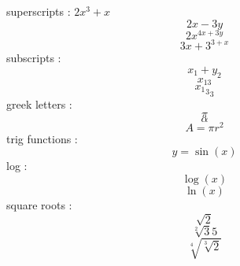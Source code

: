 \documentclass[12pt]{article}
\begin{document}
	superscripts : $2x^3+x$
    $$2x-3y$$
	$$2x^{4x+3y}$$
	$$3x+3^{3+x}$$
	subscripts : 
	$$x_1+y_2$$
	$$x_{13}$$
	$${{x_1}_3}_3$$
	greek letters : 
	$$\pi$$
	$$\alpha$$
	$$A=\pi r^2$$
	trig functions :
	$$y=\sin(x)$$
	log : 
	$$\log(x)$$
	$$\ln(x)$$
	square roots : 
	$$\sqrt{2}$$
	$$\sqrt[2]{3}{5}$$
	$$\sqrt[4]{\sqrt[3]{2}}$$
\end{document}
